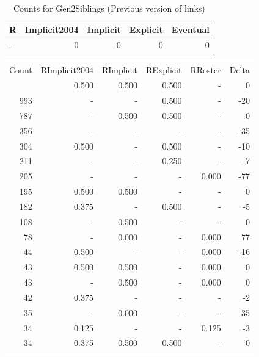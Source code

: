 \documentclass[a4paper]{article}\usepackage{graphicx, color}
\begin{document}
\begin{table}[ht]
\centering
{\large
\begin{tabular}{lrrrr}
  \hline
R & Implicit2004 & Implicit & Explicit & Eventual \\ 
  \hline
- &   0 &   0 &   0 &   0 \\ 
   \hline
\end{tabular}
}
\caption{Counts for Gen2Siblings (Previous version of links)} 
\end{table}



\begin{table}[ht]
\centering
\begin{tabular}{rrrrrr}
  \hline
Count & RImplicit2004 & RImplicit & RExplicit & RRoster & Delta \\ 
  \rowcolor{goodColor}  \hline
1192 & 0.500 & 0.500 & 0.500 & - & 0 \\ 
   \rowcolor{sosoColor} 993 & - & - & 0.500 & - & -20 \\ 
   \rowcolor{goodColor} 787 & - & 0.500 & 0.500 & - & 0 \\ 
   \rowcolor{nullColor} 356 & - & - & - & - & -35 \\ 
   \rowcolor{sosoColor} 304 & 0.500 & - & 0.500 & - & -10 \\ 
   \rowcolor{sosoColor} 211 & - & - & 0.250 & - & -7 \\ 
   \rowcolor{nullColor} 205 & - & - & - & 0.000 & -77 \\ 
  195 & 0.500 & 0.500 & - & - & 0 \\ 
   \rowcolor{sosoColor} 182 & 0.375 & - & 0.500 & - & -5 \\ 
  108 & - & 0.500 & - & - & 0 \\ 
  78 & - & 0.000 & - & 0.000 & 77 \\ 
   \rowcolor{nullColor} 44 & 0.500 & - & - & 0.000 & -16 \\ 
  43 & 0.500 & 0.500 & - & 0.000 & 0 \\ 
  43 & - & 0.500 & - & 0.000 & 0 \\ 
   \rowcolor{nullColor} 42 & 0.375 & - & - & - & -2 \\ 
  35 & - & 0.000 & - & - & 35 \\ 
   \rowcolor{nullColor} 34 & 0.125 & - & - & 0.125 & -3 \\ 
   \rowcolor{goodColor} 34 & 0.375 & 0.500 & 0.500 & - & 0 \\ 

\end{tabular}
\end{table}
\end{document}
